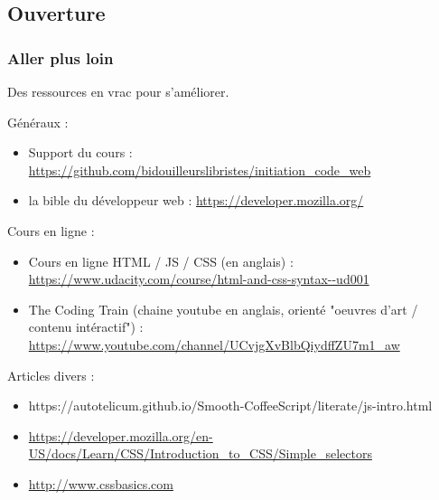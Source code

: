 \documentclass{beamer}
\begin{document}
	\subsection{Ouverture}
	\begin{frame}
		\frametitle{Aller plus loin}
		Des ressources en vrac pour s'améliorer. 

		\vspace{0.4cm}
		Généraux : 
		\begin{itemize}
			\item Support du cours : \url{https://github.com/bidouilleurslibristes/initiation_code_web} 
			\item la bible du développeur web : \url{https://developer.mozilla.org/}
		\end{itemize}	
		
		\vspace{0.4cm}
		Cours en ligne : 
		\begin{itemize}
			\item Cours en ligne HTML / JS / CSS (en anglais) : \url{https://www.udacity.com/course/html-and-css-syntax--ud001}
			\item The Coding Train (chaine youtube en anglais, orienté "oeuvres d'art / contenu intéractif") : \url{https://www.youtube.com/channel/UCvjgXvBlbQiydffZU7m1_aw}
		\end{itemize}			
		
		\vspace{0.4cm}		
		Articles divers : 
		\begin{itemize}
			\item https://autotelicum.github.io/Smooth-CoffeeScript/literate/js-intro.html
			\item \url{https://developer.mozilla.org/en-US/docs/Learn/CSS/Introduction_to_CSS/Simple_selectors}
			\item \url{http://www.cssbasics.com}
		\end{itemize}
	\end{frame}
	
\end{document}
